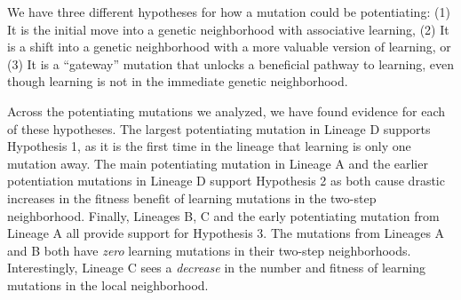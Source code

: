 We have three different hypotheses for how a mutation could be potentiating:
(1) It is the initial move into a genetic neighborhood with associative learning,
(2) It is a shift into a genetic neighborhood with a more valuable version of learning, or
(3) It is a ``gateway'' mutation that unlocks a beneficial pathway to learning, even though learning is not in the immediate genetic neighborhood.

Across the potentiating mutations we analyzed, we have found evidence for each of these hypotheses.
The largest potentiating mutation in Lineage D supports Hypothesis 1, as it is the first time in the lineage that learning is only one mutation away. 
The main potentiating mutation in Lineage A and the earlier potentiation mutations in Lineage D support Hypothesis 2 as both cause drastic increases in the fitness benefit of learning mutations in the two-step neighborhood. 
Finally, Lineages B, C and the early potentiating mutation from Lineage A all provide support for Hypothesis 3. 
The mutations from Lineages A and B both have \textit{zero} learning mutations in their two-step neighborhoods. 
Interestingly, Lineage C sees a \textit{decrease} in the number and fitness of learning mutations in the local neighborhood. %

